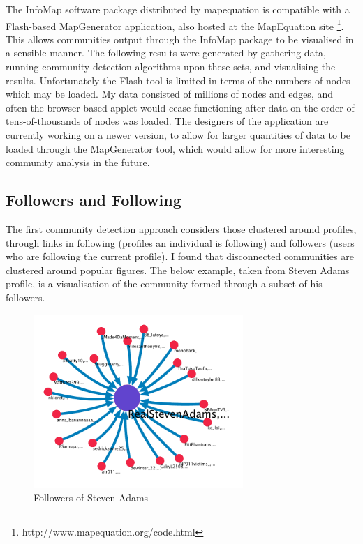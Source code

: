 The InfoMap software package distributed by mapequation is compatible with a Flash-based MapGenerator application, also hosted at the MapEquation site \footnote{http://www.mapequation.org/code.html}. This allows communities output through the InfoMap package to be visualised in a sensible manner. The following results were generated by gathering data, running community detection algorithms upon these sets, and visualising the results. Unfortunately the Flash tool is limited in terms of the numbers of nodes which may be loaded. My data consisted of millions of nodes and edges, and often the browser-based applet would cease functioning after data on the order of tens-of-thousands of nodes was loaded. The designers of the application are currently working on a newer version, to allow for larger quantities of data to be loaded through the MapGenerator tool, which would allow for more interesting community analysis in the future. 

\subsection{Followers and Following}

The first community detection approach considers those clustered around profiles, through links in following (profiles an individual is following) and followers (users who are following the current profile). I found that disconnected communities are clustered around popular figures. The below example, taken from Steven Adams profile, is a visualisation of the community formed through a subset of his followers. 

\begin{figure}[h!]
\begin{center}
\centering
\includegraphics[width=300px]{Images/steven_adams_followers.pdf}
\caption{Followers of Steven Adams}
\end{center}
\end{figure}

